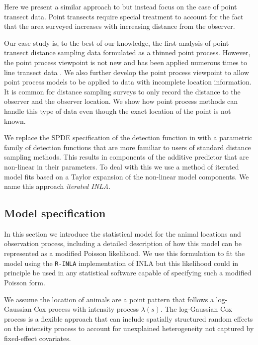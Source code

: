 \documentclass[preprint,12pt]{elsarticle}
\begin{document}
Here we present a similar approach to \citet{yuan_point_2017} but instead focus on the case of point transect data.  Point transects require special treatment to account for the fact that the area surveyed increases with increasing distance from the observer.  

Our case study is, to the best of our knowledge, the first analysis of point transect distance sampling data formulated as a thinned point process.  However, the point process viewpoint is not new and has been applied numerous times to line transect data \citep{buckland_model-based_2016, johnson_model-based_2010, hedley_spatial_2004,  hogmander_random_1991, stoyan_remark_1982}.  We also further develop the point process viewpoint to allow point process models to be applied to data with incomplete location information.  It is common for distance sampling surveys to only record the distance to the observer and the observer location.  We show how point process methods can handle this type of data even though the exact location of the point is not known.

We replace the SPDE specification of the detection function in \cite{yuan_point_2017} with a parametric family of detection functions that are more familiar to users of standard distance sampling methods.  This results in components of the additive predictor that are non-linear in their parameters.  To deal with this we use a method of iterated model fits based on a Taylor expansion of the non-linear model components.  We name this approach \textit{iterated INLA}.  

\subsection{Model specification}

In this section we introduce the statistical model for the animal locations and observation process, including a detailed description of how this model can be represented as a modified Poisson likelihood.  We use this formulation to fit the model using the \texttt{R-INLA} implementation of INLA but this likelihood could in principle be used in any statistical software capable of specifying such a modified Poisson form.  

We assume the location of animals are a point pattern that follows a log-Gaussian Cox process with intensity process $\lambda(s)$.  The log-Gaussian Cox process is a flexible approach that can include spatially structured random effects on the intensity process to account for unexplained heterogeneity not captured by fixed-effect covariates.
\end{document}
